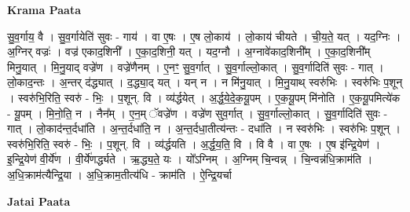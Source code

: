 \documentclass[17pt]{extarticle}
\begin{document}
\textbf{Krama Paata} \newline

सु॒व॒र्गाय॒ वै । सु॒व॒र्गायेति॑ सुवः - गाय॑ । वा ए॒षः । ए॒ष लो॒काय॑ । लो॒काय॑ चीयते । ची॒य॒ते॒ यत् । यद॒ग्निः । अ॒ग्निर् वज्रः॑ । वज्र॑ एकाद॒शिनी᳚ । ए॒का॒द॒शिनी॒ यत् । यद॒ग्नौ । अ॒ग्नावे॑काद॒शिनी᳚म् । ए॒का॒द॒शिनी᳚म् मिनु॒यात् । मि॒नु॒याद् वज्रे॑ण । वज्रे॑णैनम् । ए॒नꣳ॒॒ सु॒व॒र्गात् । सु॒व॒र्गाल्लो॒कात् । सु॒व॒र्गादिति॑ सुवः - गात् । लो॒काद॒न्तः । अ॒न्तर् द॑द्ध्यात् । द॒द्ध्या॒द् यत् । यन् न । न मि॑नु॒यात् । मि॒नु॒याथ् स्वरु॑भिः । स्वरु॑भिः प॒शून् । स्वरु॑भि॒रिति॒ स्वरु॑ - भिः॒ । प॒शून्. वि । व्य॑र्द्धयेत् । अ॒र्द्ध॒ये॒दे॒क॒यू॒पम् । ए॒क॒यू॒पम् मि॑नोति । ए॒क॒यू॒पमित्ये॑क - यू॒पम् । मि॒नो॒ति॒ न । नैन᳚म् । ए॒न॒म् ॅवज्रे॑ण । वज्रे॑ण सुव॒र्गात् । सु॒व॒र्गाल्लो॒कात् । सु॒व॒र्गादिति॑ सुवः - गात् । लो॒काद॑न्त॒र्दधा॑ति । अ॒न्त॒र्दधा॑ति॒ न । अ॒न्त॒र्दधा॒तीत्य॑न्तः - दधा॑ति । न स्वरु॑भिः । स्वरु॑भिः प॒शून् । स्वरु॑भि॒रिति॒ स्वरु॑ - भिः॒ । प॒शून्. वि । व्य॑र्द्धयति । अ॒र्द्ध॒य॒ति॒ वि । वि वै । वा ए॒षः । ए॒ष इ॑न्द्रि॒येण॑ । इ॒न्द्रि॒येण॑ वी॒र्ये॑ण । वी॒र्ये॑णर्द्ध्यते । ऋ॒द्ध्य॒ते॒ यः । यो᳚ऽग्निम् । अ॒ग्निम् चि॒न्वन्न् । चि॒न्वन्न॑धि॒क्राम॑ति । अ॒धि॒क्राम॑त्यैन्द्रि॒या । अ॒धि॒क्राम॒तीत्य॑धि - क्राम॑ति । ऐ॒न्द्रि॒यर्चा \newline

\textbf{Jatai Paata} \newline
\end{document}
